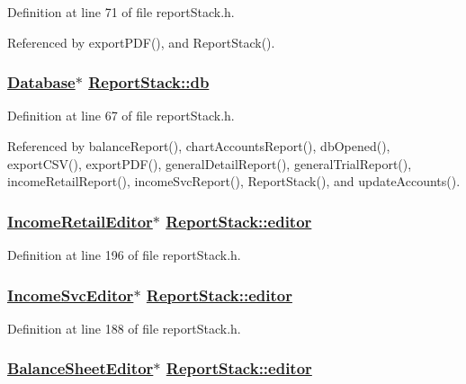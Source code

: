 Definition at line 71 of file report\-Stack.h.

Referenced by export\-PDF(), and Report\-Stack().\hypertarget{classReportStack_r0}{
\subsubsection[db]{\setlength{\rightskip}{0pt plus 5cm}\hyperlink{classDatabase}{Database}$\ast$ \hyperlink{classReportStack_r0}{Report\-Stack::db}}}
\label{classReportStack_r0}


Definition at line 67 of file report\-Stack.h.

Referenced by balance\-Report(), chart\-Accounts\-Report(), db\-Opened(), export\-CSV(), export\-PDF(), general\-Detail\-Report(), general\-Trial\-Report(), income\-Retail\-Report(), income\-Svc\-Report(), Report\-Stack(), and update\-Accounts().\hypertarget{classReportStack_r110}{
\subsubsection[editor]{\setlength{\rightskip}{0pt plus 5cm}\hyperlink{classIncomeRetailEditor}{Income\-Retail\-Editor}$\ast$ \hyperlink{classReportStack_r98}{Report\-Stack::editor}}}
\label{classReportStack_r110}


Definition at line 196 of file report\-Stack.h.\hypertarget{classReportStack_r104}{
\subsubsection[editor]{\setlength{\rightskip}{0pt plus 5cm}\hyperlink{classIncomeSvcEditor}{Income\-Svc\-Editor}$\ast$ \hyperlink{classReportStack_r98}{Report\-Stack::editor}}}
\label{classReportStack_r104}


Definition at line 188 of file report\-Stack.h.\hypertarget{classReportStack_r98}{
\subsubsection[editor]{\setlength{\rightskip}{0pt plus 5cm}\hyperlink{classBalanceSheetEditor}{Balance\-Sheet\-Editor}$\ast$ \hyperlink{classReportStack_r98}{Report\-Stack::editor}}}
\label{classReportStack_r98}


